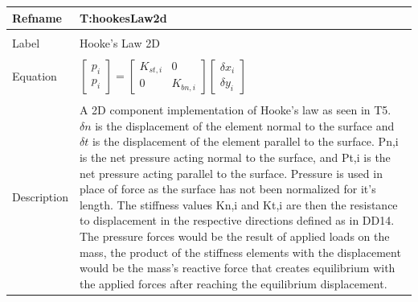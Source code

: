 \documentclass[12pt]{article}
\begin{document}
\noindent \begin{minipage}{\textwidth}
\begin{tabular}{p{} p{}}
\toprule \textbf{Refname} & \textbf{T:hookesLaw2d}
\label{T:hookesLaw2d}
\\ \midrule \\
Label & Hooke's Law 2D
\\ \midrule \\
Equation & $\begin{bmatrix}
p_{i}\\
p_{i}
\end{bmatrix}=\begin{bmatrix}
{K_{st,i}} & 0\\
0 & {K_{bn,i}}
\end{bmatrix} \begin{bmatrix}
{\delta{}x}_{i}\\
{\delta{}y}_{i}
\end{bmatrix}$
\\ \midrule \\
Description & A 2D component implementation of Hooke's law as seen in T5. $\delta{}n$ is the displacement of the element normal to the surface and $\delta{}t$ is the displacement of the element parallel to the surface. Pn,i is the net pressure acting normal to the surface, and Pt,i is the net pressure acting parallel to the surface. Pressure is used in place of force as the surface has not been normalized for it's length. The stiffness values Kn,i and Kt,i are then the resistance to displacement in the respective directions defined as in DD14. The pressure forces would be the result of applied loads on the mass, the product of the stiffness elements with the displacement would be the mass's reactive force that creates equilibrium with the applied forces after reaching the equilibrium displacement.
\\ \bottomrule \end{tabular}
\end{minipage}\\
~\newline
\end{document}
